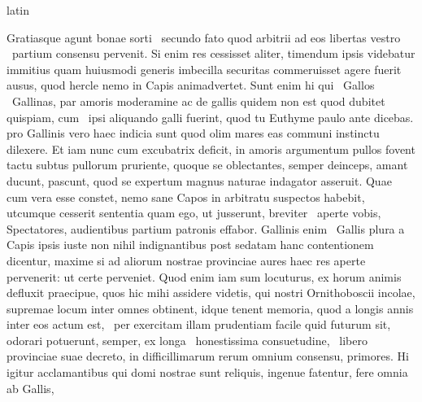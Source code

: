\documentclass[12pt]{book}
\renewenvironment{latin}
    	{\begin{hyphenrules}{latin}}
    	{\end{hyphenrules}}
\begin{document}
\begin{pages}
\begin{latin}
\begin{Leftside}
                        Gratiasque agunt bonae sorti ﻿\ampersand\ secundo fato quod arbitrii ad eos libertas vestro ﻿\ampersand\ partium consensu pervenit. 
                        Si enim res cessisset aliter, timendum ipsis videbatur 
                         immitius quam huiusmodi generis imbecilla securitas commeruisset agere fuerit ausus, quod hercle nemo in Capis animadvertet. 
                        Sunt enim hi qui ﻿\ampersand\ Gallos ﻿\ampersand\ Gallinas, par amoris moderamine  
                        ac de gallis quidem non est quod dubitet quispiam, cum ﻿\ampersand\ ipsi aliquando galli fuerint, 
                        quod tu Euthyme paulo ante dicebas. 
                        pro Gallinis vero haec indicia sunt quod olim mares eas communi instinctu dilexere. 
                        Et iam nunc cum excubatrix deficit, in amoris argumentum pullos fovent tactu subtus  pullorum pruriente, quoque se oblectantes, 
                        semper deinceps, amant ducunt, pascunt, 
                        quod se expertum magnus naturae indagator asseruit. 
                        Quae cum vera esse constet, nemo sane Capos in arbitratu suspectos habebit, utcumque cesserit sententia 
                        quam ego, ut jusserunt, breviter ﻿\ampersand\ aperte vobis, Spectatores,
                        audientibus partium patronis effabor.  
                         Gallinis enim ﻿\ampersand\ Gallis plura a Capis ipsis iuste non nihil indignantibus 
                        post sedatam hanc contentionem dicentur, maxime si ad aliorum nostrae provinciae aures haec res aperte pervenerit: 
                        ut certe perveniet. 
                        Quod enim iam sum locuturus, ex horum animis defluxit praecipue, quos hic mihi assidere videtis, 
                        qui nostri Ornithoboscii incolae, supremae  locum inter omnes obtinent, 
                        idque tenent memoria, quod a longis annis inter eos actum est, ﻿\ampersand\ per exercitam illam prudentiam facile quid futurum sit, 
                        odorari potuerunt, semper, ex longa ﻿\ampersand\ honestissima consuetudine, ﻿\ampersand\ libero provinciae suae decreto, 
                        in difficillimarum rerum  omnium consensu, primores. 
                        Hi igitur acclamantibus qui domi nostrae sunt reliquis, ingenue fatentur, fere omnia ab Gallis, 

\end{Leftside}
\end{latin}
\end{pages}
\end{document}
